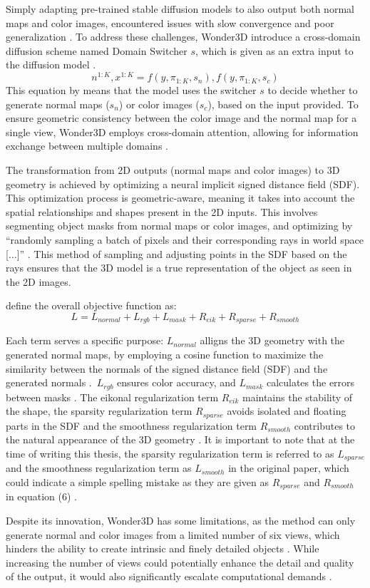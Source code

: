 Simply adapting pre-trained stable diffusion models to also output both normal maps and color images, encountered issues with slow convergence and poor generalization \citep{long2023wonder3d}. To address these challenges, Wonder3D introduce a cross-domain diffusion scheme named Domain Switcher \(s\), which is given as an extra input to the diffusion model \citep{long2023wonder3d}. \[
  n^{1:K}, x^{1:K} = f(y, \pi_{1:K}, s_n), f(y, \pi_{1:K}, s_c)
\] This equation by \citeauthor{long2023wonder3d} means that the model uses the switcher \( s \) to decide whether to generate normal maps (\( s_n \)) or color images (\( s_c \)), based on the input provided. To ensure geometric consistency between the color image and the normal map for a single view, Wonder3D employs cross-domain attention, allowing for information exchange between multiple domains \citep{long2023wonder3d}.

The transformation from 2D outputs (normal maps and color images) to 3D geometry is achieved by optimizing a neural implicit signed distance field (SDF). This optimization process is geometric-aware, meaning it takes into account the spatial relationships and shapes present in the 2D inputs. This involves segmenting object masks from normal maps or color images, and optimizing by ``randomly sampling a batch of pixels and their corresponding rays in world space [\(\ldots\)]'' \citep{long2023wonder3d}. This method of sampling and adjusting points in the SDF based on the rays ensures that the 3D model is a true representation of the object as seen in the 2D images.

\citeauthor{long2023wonder3d} define the overall objective function as: \[ L = L_{normal} + L_{rgb} + L_{mask} + R_{eik} + R_{sparse} + R_{smooth} \]

Each term serves a specific purpose: \( L_{normal} \) alligns the 3D geometry with the generated normal maps, by employing a cosine function to maximize the similarity between the normals of the signed distance field (SDF) and the generated normals \citep{long2023wonder3d}.~\( L_{rgb} \) ensures color accuracy, and \( L_{mask} \) calculates the errors between masks \citep{long2023wonder3d}. The eikonal regularization term \( R_{eik} \) maintains the stability of the shape, the sparsity regularization term \( R_{sparse} \) avoids isolated and floating parts in the SDF and the smoothness regularization term \( R_{smooth} \) contributes to the natural appearance of the 3D geometry \citep{long2023wonder3d}. It is important to note that at the time of writing this thesis, the sparsity regularization term is referred to as \( L_{sparse} \) and the smoothness regularization term as \( L_{smooth} \) in the original paper, which could indicate a simple spelling mistake as they are given as \( R_{sparse} \) and \( R_{smooth} \) in equation (6) \citep{long2023wonder3d}.

Despite its innovation, Wonder3D has some limitations, as the method can only generate normal and color images from a limited number of six views, which hinders the ability to create intrinsic and finely detailed objects \citep{long2023wonder3d}.  While increasing the number of views could potentially enhance the detail and quality of the output, it would also significantly escalate computational demands \citep{long2023wonder3d}.